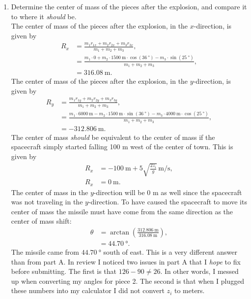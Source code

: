 \documentclass[a4paper, 12pt]{config/homework}
\begin{document}
\begin{enumerate}
\begin{enumerate}[label=\Alph*.]
\pagebreak
\item Determine the center of mass of the pieces after the explosion, and compare it to where it \textit{should} be.
\\ The center of mass of the pieces after the explosion, in the \(x\)-direction, is given by
\begin{align*}
R_x &= \frac{m_1 r_{1x} + m_2 r_{2x} + m_3 r_{3x}}{m_1 + m_2 + m_3},\\
&= \frac{m_1\cdot 0 + m_2\cdot\qty{1500}{\meter}\cdot\cos(\qty{36}{\degree}) - m_3\cdot\sin(\qty{25}{\degree})}{m_1 + m_2 + m_3},\\
&= \qty{316.08}{\meter}.
\end{align*}
The center of mass of the pieces after the explosion, in the \(y\)-direction, is given by
\begin{align*}
R_y &= \frac{m_1 r_{1y} + m_2 r_{2y} + m_3 r_{3y}}{m_1 + m_2 + m_3},\\
&= \frac{m_1\cdot \qty{6000}{\meter} - m_2\cdot\qty{1500}{\meter}\cdot\sin(\qty{36}{\degree}) - m_3\cdot\qty{4000}{\meter}\cdot\cos(\qty{25}{\degree})}{m_1 + m_2 + m_3},\\
&= \qty{-312.806}{\meter}.
\end{align*}
The center of mass \textit{should} be equivalent to the center of mass if the spacecraft simply started falling 100 m west of the center of town. This is given by
\begin{align*}
R_x &= \qty{-100}{\meter} + 5\sqrt{\frac{2 z_i}{g}}\,\unit{\meter\per\second},\\
R_x &= \qty{0}{\meter}.
\end{align*}
The center of mass in the \(y\)-direction will be 0 m as well since the spacecraft was not traveling in the \(y\)-direction. To have caused the spacecraft to move its center of mass the missile must have come from the same direction as the center of mass shift:
\begin{align*}
\theta &= \arctan\left(\frac{\qty{312.806}{\meter}}{\qty{316.08}{\meter}}\right),\\
&= \qty{44.70}{\degree}.
\end{align*}
The missile came from \(\qty{44.70}{\degree}\) south of east. This is a very different answer than from part A. In review I noticed two issues in part A that I \textit{hope} to fix before submitting. The first is that \(126 - 90 \ne 26\). In other words, I messed up when converting my angles for piece 2. The second is that when I plugged these numbers into my calculator I did not convert \(z_i\) to meters.
\end{enumerate}


\end{enumerate}
\end{document}
